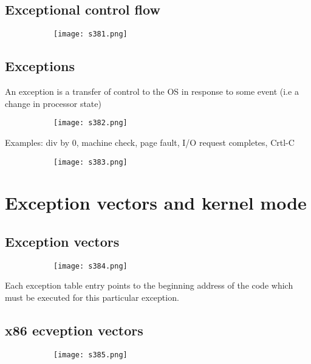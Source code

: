 \documentclass[8pt]{extreport}
\begin{document}
\subsection{Exceptional control flow}
\begin{figure}[H]
\begin{subfigure}[b]{0.4\linewidth}
\texttt{[image: s381.png]}
\end{subfigure}
\end{figure}

\subsection{Exceptions}

An exception is a transfer of control to the OS in response to some event (i.e a change in processor state)
\begin{figure}[H]
\begin{subfigure}[b]{0.4\linewidth}
\texttt{[image: s382.png]}
\end{subfigure}
\end{figure}
Examples: div by 0, machine check, page fault, I/O request completes, Crtl-C
\begin{figure}[H]
\begin{subfigure}[b]{0.4\linewidth}
\texttt{[image: s383.png]}
\end{subfigure}
\end{figure}

\section{Exception vectors and kernel mode}


\subsection{Exception vectors}
\begin{figure}[H]
\begin{subfigure}[b]{0.4\linewidth}
\texttt{[image: s384.png]}
\end{subfigure}
\end{figure}
Each exception table entry points to the beginning address of the code which must be executed for this particular exception.

\subsection{x86 ecveption vectors}
\begin{figure}[H]
\begin{subfigure}[b]{0.4\linewidth}
\texttt{[image: s385.png]}
\end{subfigure}
\end{figure}
\end{document}
